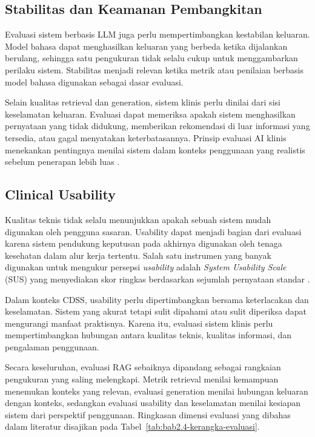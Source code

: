 \subsection{Stabilitas dan Keamanan Pembangkitan}
\label{subsec:bab2-stability-generation-safety}

Evaluasi sistem berbasis LLM juga perlu mempertimbangkan kestabilan keluaran. Model bahasa dapat menghasilkan keluaran yang berbeda ketika dijalankan berulang, sehingga satu
pengukuran tidak selalu cukup untuk menggambarkan perilaku sistem. Stabilitas menjadi relevan ketika metrik atau penilaian berbasis model bahasa digunakan sebagai dasar
evaluasi.

Selain kualitas retrieval dan generation, sistem klinis perlu dinilai dari sisi keselamatan keluaran. Evaluasi dapat memeriksa apakah sistem menghasilkan pernyataan yang tidak
didukung, memberikan rekomendasi di luar informasi yang tersedia, atau gagal menyatakan keterbatasannya. Prinsip evaluasi AI klinis menekankan pentingnya menilai sistem dalam
konteks penggunaan yang realistis sebelum penerapan lebih luas \parencite{vasey2022}.

\subsection{Clinical Usability}
\label{subsec:bab2-clinical-usability}

Kualitas teknis tidak selalu menunjukkan apakah sebuah sistem mudah digunakan oleh pengguna sasaran. Usability dapat menjadi bagian dari evaluasi karena sistem pendukung
keputusan pada akhirnya digunakan oleh tenaga kesehatan dalam alur kerja tertentu. Salah satu instrumen yang banyak digunakan untuk mengukur persepsi \textit{usability} adalah
\textit{System Usability Scale} (SUS) yang menyediakan skor ringkas berdasarkan sejumlah pernyataan standar \parencite{brooke1996}.

Dalam konteks CDSS, usability perlu dipertimbangkan bersama keterlacakan dan keselamatan. Sistem yang akurat tetapi sulit dipahami atau sulit diperiksa dapat mengurangi
manfaat praktisnya. Karena itu, evaluasi sistem klinis perlu mempertimbangkan hubungan antara kualitas teknis, kualitas informasi, dan pengalaman penggunaan.

Secara keseluruhan, evaluasi RAG sebaiknya dipandang sebagai rangkaian pengukuran yang saling melengkapi. Metrik retrieval menilai kemampuan menemukan konteks yang relevan, 
evaluasi generation menilai hubungan keluaran dengan konteks, sedangkan evaluasi usability dan keselamatan menilai kesiapan sistem dari perspektif penggunaan. Ringkasan dimensi
evaluasi yang dibahas dalam literatur disajikan pada Tabel~\ref{tab:bab2.4-kerangka-evaluasi}.


